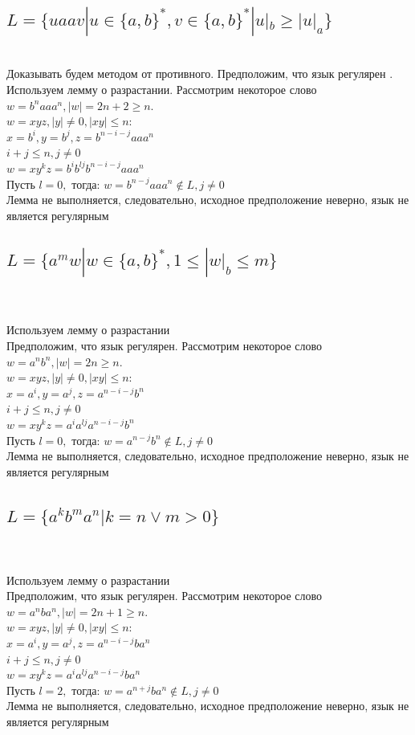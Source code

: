\documentclass{article}
\begin{document}
\subsection{$L = \{ uaav  | u \in \{a,b\}^* ,  v \in \{a, b\}^* |u|_b\ge|u|_a  \}$}\\
Доказывать будем методом от противного.
Предположим, что язык регулярен . Используем лемму о разрастании.
Рассмотрим некоторое слово
$w = b^naaa^n, |w| = 2n+2 \ge n.$\\
$w = xyz, |y| \ne 0, |xy| \le n:$\\
$x = b^i, y = b^j, z = b^{n-i-j}aaa^n$\\
$i + j \le n, j \ne 0 $\\
$w = xy^kz=b^ib^{lj}b^{n-i-j}aaa^n$\\
Пусть $l=0,$ тогда: $w = b^{n-j}aaa^n \notin L  ,j \ne 0$\\
Лемма не выполняется, следовательно, исходное предположение неверно, язык не является регулярным\\
\subsection{$L = \{ a^mw  | w \in \{a,b\}^* , 1 \le |w|_b \le m   \} $}\\
\\ Используем лемму о разрастании\\
Предположим, что язык регулярен.
Рассмотрим некоторое слово
$w = a^nb^n, |w| = 2n \ge n.$\\
$w = xyz, |y| \ne 0, |xy| \le n:$\\
$x = a^i, y = a^j, z = a^{n-i-j}b^n$\\
$i + j \le n, j \ne 0 $\\
$w = xy^kz=a^ia^{lj}a^{n-i-j}b^n$\\
Пусть $l=0,$ тогда: $w = a^{n-j}b^n \notin L  ,j \ne 0$\\
Лемма не выполняется, следовательно, исходное предположение неверно, язык не является регулярным\\
\subsection{$L = \{ a^kb^ma^n  | k = n \vee m > 0  \} $}\\
\\ Используем лемму о разрастании\\
Предположим, что язык регулярен. Рассмотрим некоторое слово
$w = a^nba^n, |w| = 2n+1 \ge n.$\\
$w = xyz, |y| \ne 0, |xy| \le n:$\\
$x = a^i, y = a^j, z = a^{n-i-j}ba^n$\\
$i + j \le n, j \ne 0 $\\
$w = xy^kz=a^ia^{lj}a^{n-i-j}ba^n$\\
Пусть $l=2,$ тогда: $w = a^{n+j}ba^n \notin L  ,j \ne 0$\\
Лемма не выполняется, следовательно, исходное предположение неверно, язык не является регулярным\\
\end{document}
